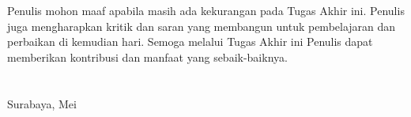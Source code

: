 Penulis mohon maaf apabila masih ada kekurangan pada Tugas Akhir ini. Penulis juga mengharapkan kritik dan saran yang membangun untuk pembelajaran dan perbaikan di kemudian hari. Semoga melalui Tugas Akhir ini Penulis dapat memberikan kontribusi dan manfaat yang sebaik-baiknya. \\ \\ \\

\hfill Surabaya, Mei \tahun \\ \\ \\

\hfill \penulis \\
\cleardoublepage
